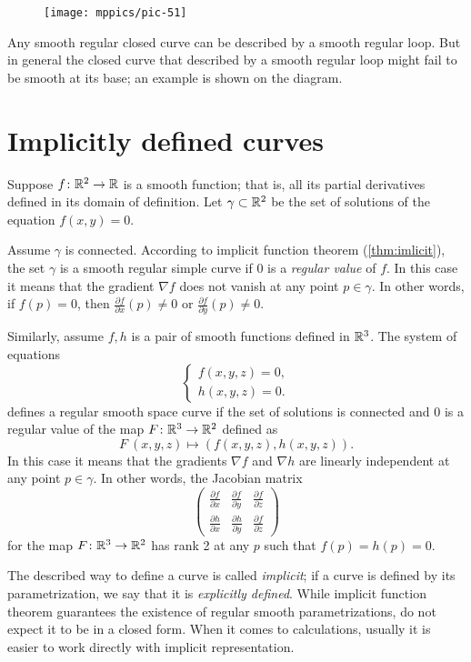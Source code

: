 {

\begin{wrapfigure}{o}{17 mm}
\vskip-3mm
\centering
\texttt{[image: mppics/pic-51]}
\end{wrapfigure}

Any smooth regular closed curve can be described by a smooth regular loop.
But in general the closed curve that described by a smooth regular loop might fail to be smooth at its base; an example is shown on the diagram.

}

\section*{Implicitly defined curves}

Suppose $f\colon\mathbb{R}^2\to \mathbb{R}$ is a smooth function; 
that is, all its partial derivatives defined in its domain of definition.
Let $\gamma\subset \mathbb{R}^2$ be the set of solutions of the equation $f(x,y)=0$.

Assume $\gamma$ is connected.
According to implicit function theorem (\ref{thm:imlicit}), the set $\gamma$ is a smooth regular simple curve if $0$ is a \emph{regular value} of $f$.
In this case it means that the gradient $\nabla f$ does not vanish at any point $p\in \gamma$.
In other words, if $f(p)=0$, then  $\tfrac{\partial f}{\partial x}(p)\ne 0$ or $\tfrac{\partial f}{\partial y}(p)\ne 0$.

Similarly, assume $f,h$ is a pair of smooth functions defined in $\mathbb{R}^3$.
The system of equations
\[\begin{cases}
   f(x,y,z)=0,
   \\
   h(x,y,z)=0.
  \end{cases}
\]
defines a regular smooth space curve if the set of solutions is connected and $0$ is a regular value of the map $F\colon\mathbb{R}^3\to\mathbb{R}^2$ defined as
\[F\:(x,y,z)\mapsto (f(x,y,z),h(x,y,z)).\]
In this case it means that the gradients $\nabla f$ and $\nabla h$ are linearly independent at any point $p\in \gamma$.
In other words, the Jacobian matrix
\[
\begin{pmatrix}
\tfrac{\partial f}{\partial x}&\tfrac{\partial f}{\partial y}&\tfrac{\partial f}{\partial z}\\
\tfrac{\partial h}{\partial x}&\tfrac{\partial h}{\partial y}&\tfrac{\partial f}{\partial z}
\end{pmatrix}
\]
for the map $F\colon\mathbb{R}^3\to\mathbb{R}^2$ has rank 2 at any $p$ such that $f(p)=h(p)=0$.

The described way to define a curve is called \emph{implicit};
if a curve is defined by its parametrization, we say that it is \emph{explicitly defined}.
While implicit function theorem guarantees the existence of regular smooth parametrizations, do not expect it to be in a closed form. 
When it comes to calculations, usually it is easier to work directly with implicit representation. 

